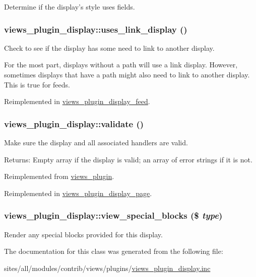 Determine if the display's style uses fields. \hypertarget{classviews__plugin__display_64d6d3c0e51efde2e050d36fbd3457dc}{
\subsubsection[{uses\_\-link\_\-display}]{\setlength{\rightskip}{0pt plus 5cm}views\_\-plugin\_\-display::uses\_\-link\_\-display ()}}
\label{classviews__plugin__display_64d6d3c0e51efde2e050d36fbd3457dc}


Check to see if the display has some need to link to another display.

For the most part, displays without a path will use a link display. However, sometimes displays that have a path might also need to link to another display. This is true for feeds. 

Reimplemented in \hyperlink{classviews__plugin__display__feed_a61e05dca3b82b696f6ea10356873a8b}{views\_\-plugin\_\-display\_\-feed}.\hypertarget{classviews__plugin__display_3282edb1b32b756937fe2d0c8757c80c}{
\subsubsection[{validate}]{\setlength{\rightskip}{0pt plus 5cm}views\_\-plugin\_\-display::validate ()}}
\label{classviews__plugin__display_3282edb1b32b756937fe2d0c8757c80c}


Make sure the display and all associated handlers are valid.

\begin{Desc}
\item[Returns:]Empty array if the display is valid; an array of error strings if it is not. \end{Desc}


Reimplemented from \hyperlink{classviews__plugin_af004b6a719837f08a1ffe4a1cf4d442}{views\_\-plugin}.

Reimplemented in \hyperlink{classviews__plugin__display__page_995cf48d67e20ef897d931fcbba391d1}{views\_\-plugin\_\-display\_\-page}.\hypertarget{classviews__plugin__display_580af377b7d46013594e518c1d31534b}{
\subsubsection[{view\_\-special\_\-blocks}]{\setlength{\rightskip}{0pt plus 5cm}views\_\-plugin\_\-display::view\_\-special\_\-blocks (\$ {\em type})}}
\label{classviews__plugin__display_580af377b7d46013594e518c1d31534b}


Render any special blocks provided for this display. 

The documentation for this class was generated from the following file:\begin{CompactItemize}
\item 
sites/all/modules/contrib/views/plugins/\hyperlink{views__plugin__display_8inc}{views\_\-plugin\_\-display.inc}\end{CompactItemize}
